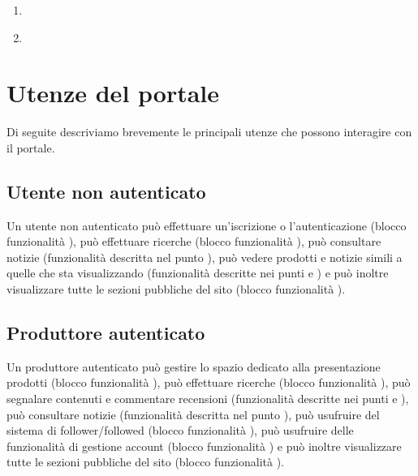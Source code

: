 \begin{enumerate}
\begin{enumerate}
            \item   {}   \label{fun:vis.profAltrui}

            \item   {}   \label{fun:vis.profStat}        
        \end{enumerate} 
\end{enumerate}

\section{Utenze del portale}
Di seguite descriviamo brevemente le principali utenze che possono interagire con il portale.

\subsection{Utente non autenticato}
Un utente non autenticato può effettuare un’iscrizione o l’autenticazione (blocco funzionalità ), può effettuare ricerche (blocco funzionalità ), può consultare notizie (funzionalità descritta nel punto ), può vedere prodotti e notizie simili a quelle che sta visualizzando (funzionalità descritte nei punti  e ) e può inoltre visualizzare tutte le sezioni pubbliche del sito (blocco funzionalità ).

\subsection{Produttore autenticato}
Un produttore autenticato può gestire lo spazio dedicato alla presentazione prodotti (blocco funzionalità ), può effettuare ricerche (blocco funzionalità ), può segnalare contenuti e commentare recensioni (funzionalità descritte nei punti  e ), può consultare notizie (funzionalità descritta nel punto ), può usufruire del sistema di follower/followed (blocco funzionalità ), può usufruire delle funzionalità di gestione account (blocco funzionalità ) e può inoltre visualizzare tutte le sezioni pubbliche del sito (blocco funzionalità ).

